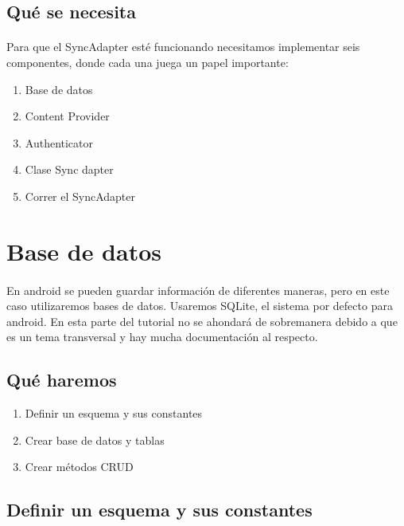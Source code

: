 \documentclass[10pt]{extarticle}
\begin{document}
\subsection{Qué se necesita}

\paragraph{}
Para que el SyncAdapter esté funcionando necesitamos implementar seis componentes, donde cada una juega un papel importante:

\begin{enumerate}
 \item Base de datos
 \item Content Provider
 \item Authenticator
 \item Clase Sync dapter
 \item Correr el SyncAdapter
\end{enumerate}



\section{Base de datos}

\paragraph{}
En android se pueden guardar información de diferentes maneras, pero en este caso utilizaremos bases de datos. Usaremos SQLite, el sistema por defecto para android. En esta parte del tutorial no se ahondará de sobremanera debido a que es un tema transversal y hay mucha documentación al respecto.

\subsection{Qué haremos}

\begin{enumerate}
 \item Definir un esquema y sus constantes
 \item Crear base de datos y tablas
 \item Crear métodos CRUD
\end{enumerate}

\subsection{Definir un esquema y sus constantes}
\end{document}
